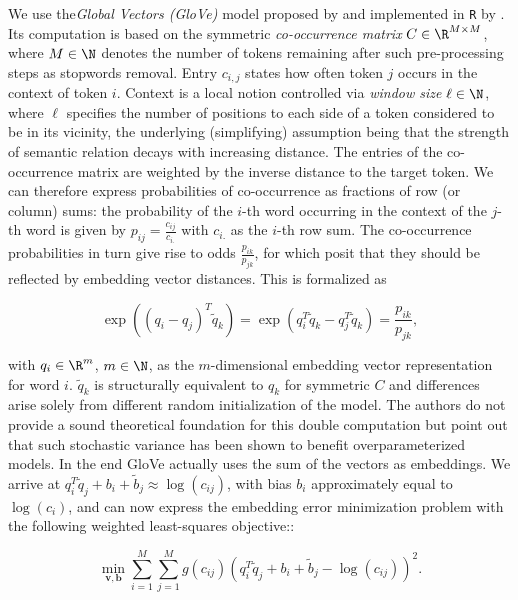 We use the\textit{Global Vectors (GloVe)} model proposed by 
\citet{penningtonetal2014} and implemented in \texttt{R} by \citet{pkgtext2vec}.
Its computation is based on the symmetric \textit{co-occurrence matrix} 
$C \in \R^{M \times M}$, where $M \in \N$ denotes the number of tokens remaining 
after such pre-processing steps as stopwords removal.
Entry $c_{i, j}$ states how often token $j$ occurs in the context of token $i$.
Context is a local notion controlled via \textit{window size} $\ell \in \N$, 
where $\ell$ specifies the number of positions to each side of a token
considered to be in its vicinity, the underlying (simplifying) assumption being 
that the strength of semantic relation decays with increasing distance.
The entries of the co-occurrence matrix are weighted by the inverse 
distance to the target token.
We can therefore express probabilities of co-occurrence as fractions of row (or 
column) sums: the probability of the $i$-th word occurring in the context of 
the $j$-th word is given by $p_{ij} = \tfrac{c_{ij}}{c_{i.}}$ with $c_{i.}$ 
as the $i$-th row sum.
The co-occurrence probabilities in turn give rise to odds 
$\frac{p_{ik}}{p_{jk}}$, for which \citet{penningtonetal2014} posit that they 
should be reflected by embedding vector distances.
This is formalized as 

\begin{equation*}
  \exp((q_i - q_j)^T \tilde q_k) = \exp(q_i^T \tilde q_k - q_j^T \tilde q_k) = 
  \frac{p_{ik}}{p_{jk}},
\end{equation*}

with $q_i \in \R^m$, $m \in \N$, as the $m$-dimensional embedding vector 
representation for word $i$.
$\tilde q_k$ is structurally equivalent to $q_k$ for symmetric $C$ and 
differences arise solely from different random initialization of the model.
The authors do not provide a sound theoretical foundation for this double 
computation but point out that such stochastic variance has been shown to 
benefit overparameterized models.
In the end GloVe actually uses the sum of the vectors as embeddings.
We arrive at $q_i^T \tilde q_j + b_i + \tilde b_j \approx \log(c_{ij})$,
with bias $b_i$ approximately equal to $\log(c_i)$, and can now express the 
embedding error minimization problem with the following weighted least-squares
objective::

\begin{equation*}
  \min_{\bm{v}, \bm{b}} \sum_{i = 1}^M \sum_{j = 1}^M g(c_{ij}) \left(
  q_i^T \tilde q_j + b_i + \tilde b_j - \log(c_{ij}) \right)^2.
\end{equation*}

